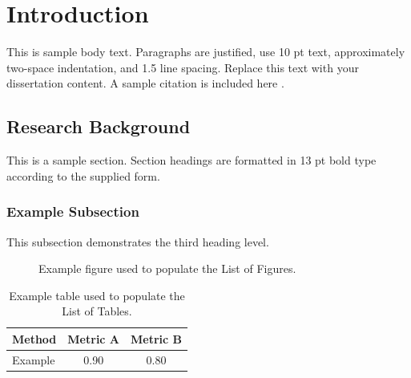 \chapter{Introduction}
\label{chap:introduction}

This is sample body text. Paragraphs are justified, use 10 pt text, approximately two-space indentation, and 1.5 line spacing. Replace this text with your dissertation content. A sample citation is included here \citep{tversky1971}.

\section{Research Background}
\label{sec:background}

This is a sample section. Section headings are formatted in 13 pt bold type according to the supplied form.

\subsection{Example Subsection}

This subsection demonstrates the third heading level.

\begin{figure}[htbp]
  \centering
  \fbox{\rule{0pt}{4cm}\rule{0.75\linewidth}{0pt}}
  \caption{Example figure used to populate the List of Figures.}
  \label{fig:example}
\end{figure}

\begin{table}[htbp]
  \centering
  \caption{Example table used to populate the List of Tables.}
  \label{tab:example}
  \begin{tabular}{lcc}
    \toprule
    Method & Metric A & Metric B \\
    \midrule
    Example & 0.90 & 0.80 \\
    \bottomrule
  \end{tabular}
\end{table}
